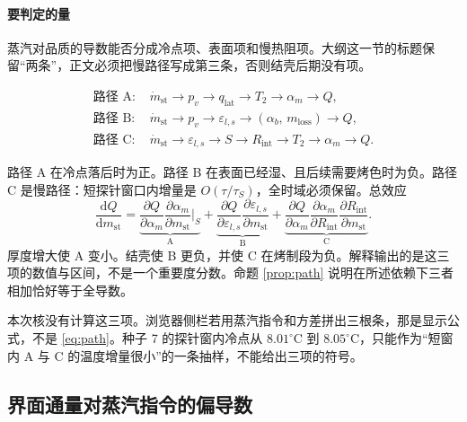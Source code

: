 \paragraph{要判定的量}
蒸汽对品质的导数能否分成冷点项、表面项和慢热阻项。大纲这一节的标题保留“两条”，正文必须把慢路径写成第三条，否则结壳后期没有项。

\begin{align}
\text{路径 A: }& \dot m_{\mathrm{st}}\to p_v\to q_{\mathrm{lat}}\to T_2\to\alpha_m\to Q,\\
\text{路径 B: }& \dot m_{\mathrm{st}}\to p_v\to\varepsilon_{l,s}\to(\alpha_b,\,m_{\mathrm{loss}})\to Q,\\
\text{路径 C: }& \dot m_{\mathrm{st}}\to\varepsilon_{l,s}\to S\to R_{\mathrm{int}}\to T_2\to\alpha_m\to Q.
\end{align}

路径 A 在冷点落后时为正。路径 B 在表面已经湿、且后续需要烤色时为负。路径 C 是慢路径：短探针窗口内增量是 \(O(\tau/\tau_S)\)，全时域必须保留。总效应
\begin{equation}
\label{eq:path}
\frac{\mathrm{d}Q}{\mathrm{d}m_{\mathrm{st}}}
=\underbrace{\frac{\partial Q}{\partial\alpha_m}\frac{\partial\alpha_m}{\partial m_{\mathrm{st}}}\Big|_{\!S}}_{\text{A}}
+\underbrace{\frac{\partial Q}{\partial\varepsilon_{l,s}}\frac{\partial\varepsilon_{l,s}}{\partial m_{\mathrm{st}}}}_{\text{B}}
+\underbrace{\frac{\partial Q}{\partial\alpha_m}\frac{\partial\alpha_m}{\partial R_{\mathrm{int}}}\frac{\partial R_{\mathrm{int}}}{\partial m_{\mathrm{st}}}}_{\text{C}}.
\end{equation}
厚度增大使 A 变小。结壳使 B 更负，并使 C 在烤制段为负。解释输出的是这三项的数值与区间，不是一个重要度分数。命题 \ref{prop:path} 说明在所述依赖下三者相加恰好等于全导数。

本次核没有计算这三项。浏览器侧栏若用蒸汽指令和方差拼出三根条，那是显示公式，不是 \eqref{eq:path}。种子 7 的探针窗内冷点从 \(8.01^\circ\mathrm{C}\) 到 \(8.05^\circ\mathrm{C}\)，只能作为“短窗内 A 与 C 的温度增量很小”的一条抽样，不能给出三项的符号。

\subsection{界面通量对蒸汽指令的偏导数}

